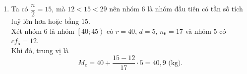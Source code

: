 \begin{bt}
{\begin{enumerate}
\begin{center}
\begin{tabular}{|c|c|c|c|}
					      $\left[50;55\right)$ & $52{,}5$                  & $1$             & $30$                     \\
					      \hline
					                           &                           & $n = 30$        &                          \\
					      \hline
				      \end{tabular}
			      \end{center}
			\item Ta có $\dfrac{n}{2} = 15$, mà $12<15<29$ nên nhóm $6$ là nhóm đầu tiên có tần số tích luỹ lớn hơn hoặc bằng $15$. \\
			      Xét nhóm $6$ là nhóm $\left[40;45\right)$ có $r=40$, $d=5$, $n_6=17$ và nhóm $5$ có $cf_5 = 12$.\\
			      Khi đó, trung vị là
			      \[
				      M_e = 40 + \dfrac{15-12}{17} \cdot 5 = 40{,}9\text{ (kg)}.
			      \]
		\end{enumerate}
	}
\end{bt}
